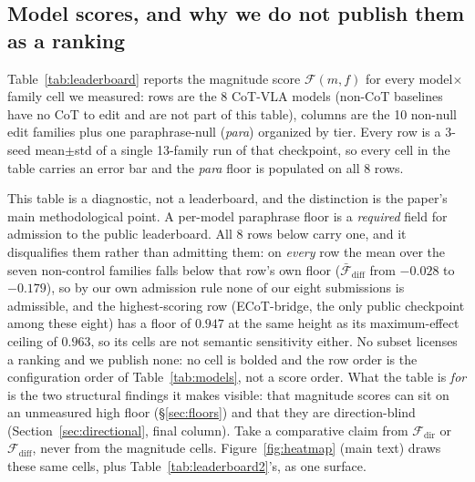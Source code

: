 \subsection{Model scores, and why we do not publish them as a ranking}
\label{sec:results}

Table~\ref{tab:leaderboard} reports the magnitude score $\mathcal{F}(m, f)$ for every model$\times$family cell we measured: rows are the 8 CoT-VLA models (non-CoT baselines have no CoT to edit and are not part of this table), columns are the 10 non-null edit families plus one paraphrase-null (\emph{para}) organized by tier. Every row is a 3-seed mean$\pm$std of a single 13-family run of that checkpoint, so every cell in the table carries an error bar and the \emph{para} floor is populated on all 8 rows.

This table is a diagnostic, not a leaderboard, and the distinction is the paper's main methodological point. A per-model paraphrase floor is a \emph{required} field for admission to the public leaderboard. All 8 rows below carry one, and it disqualifies them rather than admitting them: on \emph{every} row the mean over the seven non-control families falls below that row's own floor ($\bar{\mathcal{F}}_{\text{diff}}$ from $-0.028$ to $-0.179$), so by our own admission rule none of our eight submissions is admissible, and the highest-scoring row (ECoT-bridge, the only public checkpoint among these eight) has a floor of $0.947$ at the same height as its maximum-effect ceiling of $0.963$, so its cells are not semantic sensitivity either. No subset licenses a ranking and we publish none: no cell is bolded and the row order is the configuration order of Table~\ref{tab:models}, not a score order. What the table is \emph{for} is the two structural findings it makes visible: that magnitude scores can sit on an unmeasured high floor (\S\ref{sec:floors}) and that they are direction-blind (Section~\ref{sec:directional}, final column). Take a comparative claim from $\mathcal{F}_{\text{dir}}$ or $\mathcal{F}_{\text{diff}}$, never from the magnitude cells. Figure~\ref{fig:heatmap} (main text) draws these same cells, plus Table~\ref{tab:leaderboard2}'s, as one surface.

